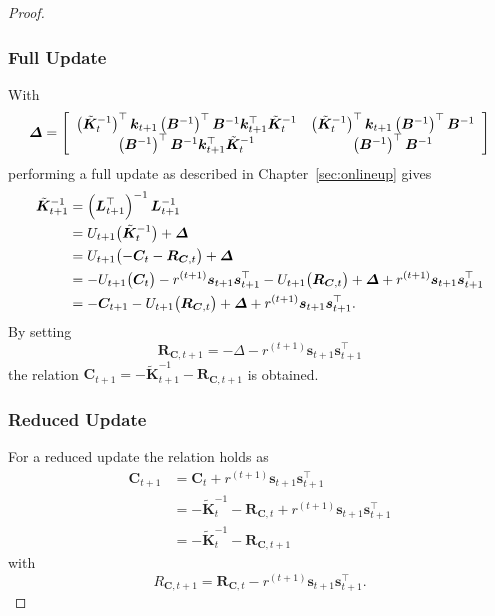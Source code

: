 \documentclass[11pt,a4paper,twoside,BCOR=15mm]{scrbook}
\newcommand{\vc}[1]{\bm{#1}}
\newcommand{\mat}[1]{\bm{#1}}
\newcommand{\Tr}{^{\top}}
\begin{document}
\begin{proof}
\subsubsection{Full Update}
With
\begin{equation*}
    \mat\varDelta = \sbr{\begin{array}{cc}
                \del[1]{\tilde{\mat K}_t^{-1}}\Tr \vc k_{t+1} \del{\mat 
                    B^{-1}}\Tr \mat B^{-1} \vc k_{t+1}\Tr \tilde{\mat K}_t^{-1} 
                & \del[1]{\tilde{\mat K}_t^{-1}}\Tr \vc k_{t+1} 
                \del{\mat{B}^{-1}}\Tr \mat B^{-1} \\
                \del{\mat B^{-1}}\Tr \mat B^{-1} \vc k_{t+1}\Tr 
                \tilde{\mat{K}}_t^{-1} & \del{\mat B^{-1}}\Tr \mat B^{-1}
            \end{array}}
\end{equation*}
performing a full update as described in Chapter~\ref{sec:onlineup} gives
\begin{align*}
    \tilde{\mat K}_{t+1}^{-1} &= \del{\mat L_{t+1}\Tr}^{-1} \mat L_{t+1}^{-1} \\
    &= U_{t+1}\!\del[1]{\tilde{\mat K}_t^{-1}} + \mat \varDelta \\
    &= U_{t+1}\!\del[1]{-\mat C_t - \mat R_{\mat C, t}} + \mat \varDelta \\
    &= -U_{t+1}\!\del[1]{\mat C_t} - r^{(t+1)} \vc s_{t+1} \vc s_{t+1}\Tr 
    - U_{t+1}\!\del[1]{\mat R_{\mat C, t}} + \mat \varDelta + r^{(t+1)} \vc 
    s_{t+1} \vc s_{t+1}\Tr \\
    &= -\mat C_{t+1} - U_{t+1}\!\del[1]{\mat R_{\mat C, t}} + \mat \varDelta 
    + r^{(t+1)} \vc s_{t+1} \vc s_{t+1}\Tr \text{.}
\end{align*}
By setting
\begin{equation*}
    \mat R_{\mat C, t+1} = -\mat \varDelta - r^{(t+1)} \vc s_{t+1} \vc 
    s_{t+1}\Tr
\end{equation*}
the relation $\mat C_{t+1} = - \tilde{\mat K}_{t+1}^{-1} - \mat R_{\mat C, t+1}$ 
is obtained.

\subsubsection{Reduced Update}
For a reduced update the relation holds as
\begin{align*}
    \mat C_{t+1} &= \mat C_t + r^{(t+1)} \vc s_{t+1} \vc s_{t+1}\Tr \\
    &= -\tilde{\mat K}_t^{-1} - \mat R_{\mat C, t} + r^{(t+1)} \vc s_{t+1} \vc 
    s_{t+1}\Tr \\
    &= -\tilde{\mat K}_t^{-1} - \mat R_{\mat C, t+1}
\end{align*}
with
\begin{equation*}
    R_{\mat C, t+1} = \mat R_{\mat C, t} - r^{(t+1)} \vc s_{t+1} \vc s_{t+1}\Tr 
    \text{.}
\end{equation*}


\end{proof}
\end{document}
